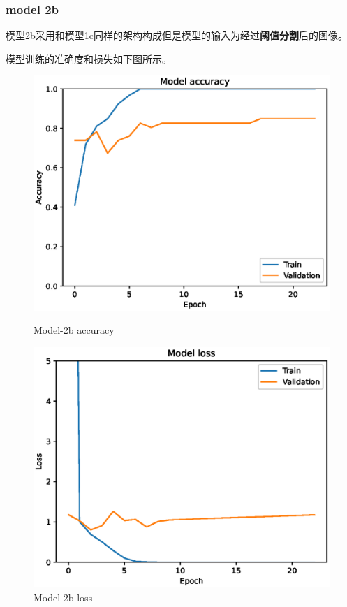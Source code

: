 \subsubsection{model 2b}

模型2b采用和模型1c同样的架构构成但是模型的输入为经过\textbf{阈值分割}后的图像。

模型训练的准确度和损失如下图所示。

\begin{figure}
    \centering
    \begin{minipage}{0.45\textwidth}
        \centering
        \includegraphics[width=\textwidth]{./fig/model2/accuracy2b.eps}
        \caption{Model-2b accuracy}
        \label{fig:model2b_acc}
    \end{minipage}
    \begin{minipage}{0.45\textwidth}
        \centering
        \includegraphics[width=\textwidth]{./fig/model2/loss2b.eps}
        \caption{Model-2b loss}
        \label{fig:model2b_loss}
    \end{minipage}
\end{figure}



